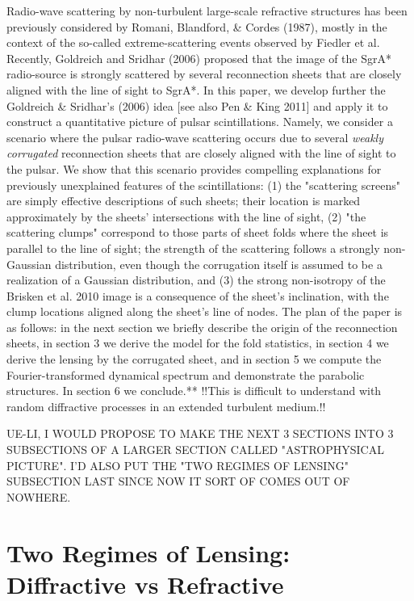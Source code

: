 \documentclass[useAMS,usenatbib]{mn2e}
\begin{document}
Radio-wave scattering by non-turbulent large-scale refractive structures has been previously
considered by Romani, Blandford, \& Cordes (1987), mostly in the context of the so-called
extreme-scattering events observed by Fiedler et al. Recently, Goldreich and Sridhar (2006) proposed that the image of the SgrA* radio-source is 
strongly scattered by several reconnection sheets that are closely aligned with the line of sight to
SgrA*.
In this paper, we develop further the Goldreich \& Sridhar's (2006) idea [see also Pen \& King 2011] 
and apply it to construct a quantitative
picture of pulsar scintillations. Namely, we consider a scenario where
the pulsar radio-wave scattering occurs due to several {\it weakly corrugated} 
reconnection sheets that are
closely aligned with the line of sight to the pulsar.  We show that this scenario provides
compelling explanations for previously unexplained features of the scintillations: 
(1)  the "scattering screens" are simply effective descriptions of such sheets; their location is marked 
approximately
by the sheets' intersections with the line of sight, (2) "the scattering clumps" correspond to 
those parts of sheet folds where the sheet is parallel 
to
the line of sight; the strength of the scattering follows a strongly non-Gaussian distribution, even though
the corrugation itself is assumed to be a realization of a Gaussian distribution, and (3) the
strong non-isotropy of the Brisken et al. 2010 image is a consequence of the sheet's inclination, 
with the clump locations aligned along the sheet's line of nodes. The plan of the paper is
as follows: in the next section we briefly describe the origin of the
reconnection sheets, in section 3  we derive the model for the fold statistics,
in section 4 we derive the lensing by the corrugated sheet, and in section 5 we compute the
Fourier-transformed dynamical spectrum and demonstrate the parabolic structures. In section 6 we conclude.**  !!This is difficult to understand with random diffractive
processes in an extended turbulent medium.!!

UE-LI, I WOULD PROPOSE TO MAKE THE NEXT 3 SECTIONS INTO 3 SUBSECTIONS OF A LARGER SECTION
CALLED "ASTROPHYSICAL PICTURE".  I'D ALSO PUT  THE "TWO REGIMES OF LENSING" SUBSECTION
LAST SINCE NOW IT SORT OF COMES OUT OF NOWHERE.
\section{Two Regimes of Lensing: Diffractive vs Refractive}
\end{document}

